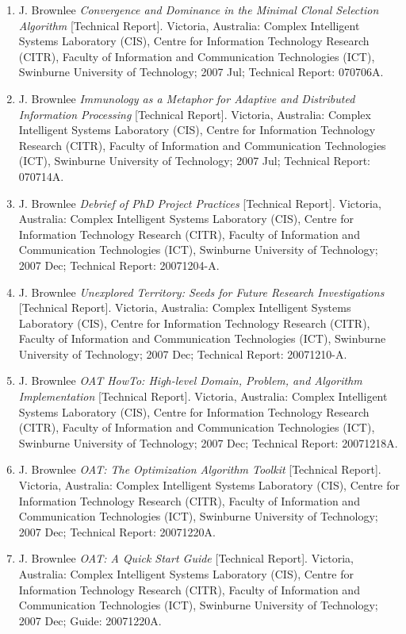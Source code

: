 \begin{enumerate}
	\item J. Brownlee \emph{Convergence and Dominance in the Minimal Clonal Selection Algorithm} [Technical Report]. Victoria, Australia: Complex Intelligent Systems Laboratory (CIS), Centre for Information Technology Research (CITR), Faculty of Information and Communication Technologies (ICT), Swinburne University of Technology; 2007 Jul; Technical Report: 070706A.
	\item J. Brownlee \emph{Immunology as a Metaphor for Adaptive and Distributed Information Processing} [Technical Report]. Victoria, Australia: Complex Intelligent Systems Laboratory (CIS), Centre for Information Technology Research (CITR), Faculty of Information and Communication Technologies (ICT), Swinburne University of Technology; 2007 Jul; Technical Report: 070714A.
	\item J. Brownlee \emph{Debrief of PhD Project Practices} [Technical Report]. Victoria, Australia: Complex Intelligent Systems Laboratory (CIS), Centre for Information Technology Research (CITR), Faculty of Information and Communication Technologies (ICT), Swinburne University of Technology; 2007 Dec; Technical Report: 20071204-A.
	\item J. Brownlee \emph{Unexplored Territory: Seeds for Future Research Investigations} [Technical Report]. Victoria, Australia: Complex Intelligent Systems Laboratory (CIS), Centre for Information Technology Research (CITR), Faculty of Information and Communication Technologies (ICT), Swinburne University of Technology; 2007 Dec; Technical Report: 20071210-A.	
	\item J. Brownlee \emph{OAT HowTo: High-level Domain, Problem, and Algorithm Implementation} [Technical Report]. Victoria, Australia: Complex Intelligent Systems Laboratory (CIS), Centre for Information Technology Research (CITR), Faculty of Information and Communication Technologies (ICT), Swinburne University of Technology; 2007 Dec; Technical Report: 20071218A.
	\item J. Brownlee \emph{OAT: The Optimization Algorithm Toolkit} [Technical Report]. Victoria, Australia: Complex Intelligent Systems Laboratory (CIS), Centre for Information Technology Research (CITR), Faculty of Information and Communication Technologies (ICT), Swinburne University of Technology; 2007 Dec; Technical Report: 20071220A.
	\item J. Brownlee \emph{OAT: A Quick Start Guide} [Technical Report]. Victoria, Australia: Complex Intelligent Systems Laboratory (CIS), Centre for Information Technology Research (CITR), Faculty of Information and Communication Technologies (ICT), Swinburne University of Technology; 2007 Dec; Guide: 20071220A.
\end{enumerate}

